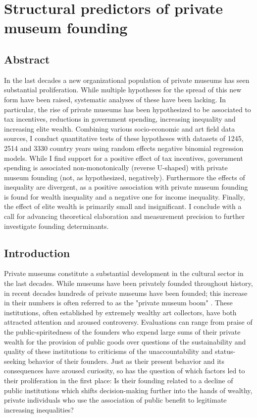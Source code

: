 \documentclass[11pt]{article}
\author{Johannes Aengenheyster}
\date{\today}
\title{}
\begin{document}
\section*{Structural predictors of private museum founding}

\subsection*{Abstract}

In the last decades a new organizational population of private museums has seen substantial proliferation.
While multiple hypotheses for the spread of this new form have been raised, systematic analyses of these have been lacking.
In particular, the rise of private museums has been hypothesized to be associated to tax incentives, reductions in government spending, increasing inequality and increasing elite wealth. 
Combining various socio-economic and art field data sources, I conduct quantitative tests of these hypotheses with datasets of 1245, 2514 and 3330 country years using random effects negative binomial regression models.
While I find support for a positive effect of tax incentives, government spending is associated non-monotonically (reverse U-shaped) with private museum founding (not, as hypothesized, negatively). 
Furthermore the effects of inequality are divergent, as a positive association with private museum founding is found for wealth inequality and a negative one for income inequality.
Finally, the effect of elite wealth is primarily small and insignificant. 
I conclude with a call for advancing theoretical elaboration and measurement precision to further investigate founding determinants. 





\subsection*{Introduction}

Private museums constitute a substantial development in the cultural sector in the last decades.
While museums have been privately founded throughout history, in recent decades hundreds of private museums have been founded; this increase in their numbers is often referred to as the "private museum boom" \parencite{Walker_2019_collector}. 
These institutions, often established by extremely wealthy art collectors, have both attracted attention and aroused controversy.
Evaluations can range from praise of the public-spiritedness of the founders who expend large sums of their private wealth for the provision of public goods over questions of the sustainability and quality of these institutions to criticisms of the unaccountability and status-seeking behavior of their founders. 
Just as their present behavior and its consequences have aroused curiosity, so has the question of which factors led to their proliferation in the first place:
Is their founding related to a decline of public institutions which shifts decision-making further into the hands of wealthy, private individuals who use the association of public benefit to legitimate increasing inequalities?
\end{document}
